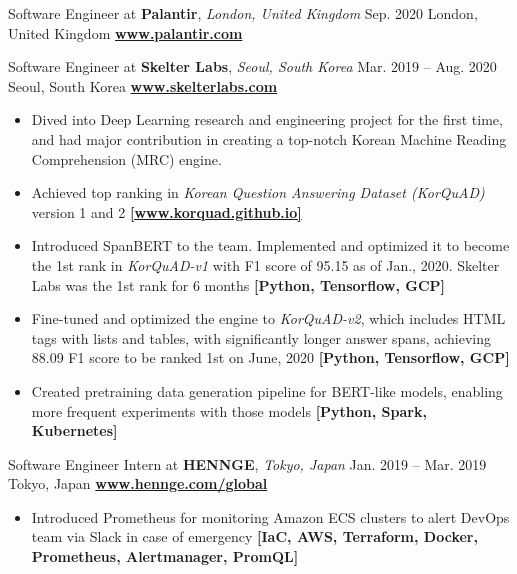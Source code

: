 \documentclass[10pt,a4paper]{altacv}
\begin{document}
    

    \large

    \cveventflat
    {Software Engineer at }
    {\textbf{Palantir}, \textit{London, United Kingdom}}
    {Sep. 2020}
    {London, United Kingdom}
    \newline
    \href{https://www.palantir.com/}{\textbf{www.palantir.com}}

    \medskip

    \cveventflat
    {Software Engineer at }
    {\textbf{Skelter Labs}, \textit{Seoul, South Korea}}
    {Mar. 2019 -- Aug. 2020}
    {Seoul, South Korea}
    \newline
    \href{https://www.skelterlabs.com/}{\textbf{www.skelterlabs.com}}
    \begin{itemize}
        \item Dived into Deep Learning research and engineering project for the first time, and had major contribution in creating a top-notch Korean Machine Reading Comprehension (MRC) engine.
        \item Achieved top ranking in \textit{Korean Question Answering Dataset (KorQuAD)} version 1 and 2
        \href{https://korquad.github.io/}{\textbf{[www.korquad.github.io]}}
        \item Introduced SpanBERT to the team. Implemented and optimized it to become the 1st rank in \textit{KorQuAD-v1} with F1 score of 95.15 as of Jan., 2020. Skelter Labs was the 1st rank for 6 months
        \textbf{[Python, Tensorflow, GCP]}
        \item Fine-tuned and optimized the engine to \textit{KorQuAD-v2}, which includes HTML tags with lists and tables, with significantly longer answer spans, achieving 88.09 F1 score to be ranked 1st on June, 2020
        \textbf{[Python, Tensorflow, GCP]}
        \item Created pretraining data generation pipeline for BERT-like models, enabling more frequent experiments with those models
        \textbf{[Python, Spark, Kubernetes]}
    \end{itemize}

    \medskip

    \cveventflat
    {Software Engineer Intern at }
    {\textbf{HENNGE}, \textit{Tokyo, Japan}}
    {Jan. 2019 -- Mar. 2019}
    {Tokyo, Japan}
    \newline
    \href{https://hennge.com/global/}{\textbf{www.hennge.com/global}}
    \begin{itemize}
        \item Introduced Prometheus for monitoring Amazon ECS clusters to alert DevOps team via Slack in case of emergency
        \textbf{[IaC, AWS, Terraform, Docker, Prometheus, Alertmanager, PromQL]}
    \end{itemize}
\end{document}
